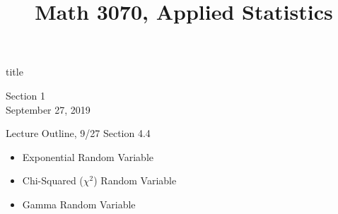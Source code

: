 \documentclass[]{beamer}
\title{Math 3070, Applied Statistics}
\newcommand{\nl}[1]{\vspace{#1 em}}
\begin{document}
\begin{frame}
    \begin{beamercolorbox}[rounded=true,wd=\textwidth,center]{title}
        \inserttitle
    \end{beamercolorbox}
    \begin{center}
        Section 1\\
        \nl{0.5}
        September 27, 2019
    \end{center}
\end{frame}
\begin{frame}{Lecture Outline, 9/27}
    Section 4.4
    \begin{itemize}
        \item Exponential Random Variable
        \item Chi-Squared ($\chi^2$) Random Variable
        \item Gamma Random Variable
    \end{itemize}
\end{frame}
\end{document}
